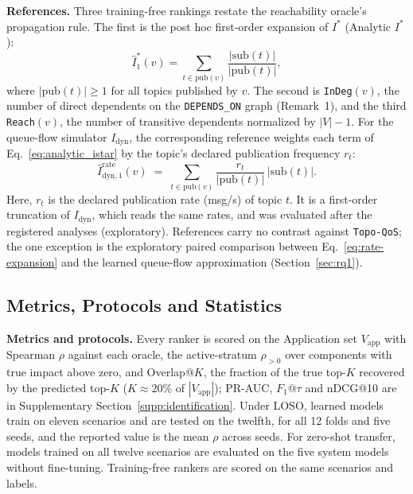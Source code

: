\noindent\textbf{References.} Three training-free rankings restate the reachability oracle's propagation rule. The first is the post hoc first-order expansion of $I^*$ (Analytic $I^*$):
\begin{equation}
\label{eq:analytic_istar}
\hat{I}^*_1(v) = \sum_{t \in \text{pub}(v)} \frac{|\text{sub}(t)|}{|\text{pub}(t)|},
\end{equation}
where $|\text{pub}(t)| \ge 1$ for all topics published by $v$. The second is \texttt{InDeg}$(v)$, the number of direct dependents on the \texttt{DEPENDS\_ON} graph (Remark~1), and the third \texttt{Reach}$(v)$, the number of transitive dependents normalized by $|V| - 1$. For the queue-flow simulator $I_{\text{dyn}}$, the corresponding reference weights each term of Eq.~\eqref{eq:analytic_istar} by the topic's declared publication frequency $r_t$:
\begin{equation}
\hat{I}^{\mathrm{rate}}_{\mathrm{dyn},1}(v) \;=\; \sum_{t \in \mathrm{pub}(v)} \frac{r_t}{|\mathrm{pub}(t)|}\,\lvert \mathrm{sub}(t) \rvert.
\label{eq:rate-expansion}
\end{equation}
Here, $r_t$ is the declared publication rate (msg/s) of topic $t$. It is a first-order truncation of $I_{\text{dyn}}$, which reads the same rates, and was evaluated after the registered analyses (exploratory). References carry no contrast against \texttt{Topo-QoS}; the one exception is the exploratory paired comparison between Eq.~\eqref{eq:rate-expansion} and the learned queue-flow approximation (Section~\ref{sec:rq1}).

\subsection{Metrics, Protocols and Statistics}
\label{sec:6.3}

\noindent\textbf{Metrics and protocols.} Every ranker is scored on the Application set $V_{\text{app}}$ with Spearman $\rho$ against each oracle, the active-stratum $\rho_{>0}$ over components with true impact above zero, and Overlap@$K$, the fraction of the true top-$K$ recovered by the predicted top-$K$ ($K \approx 20\%$ of $|V_{\text{app}}|$); PR-AUC, $F_1@\tau$ and nDCG@10 are in Supplementary Section~\ref{supp:identification}. Under LOSO, learned models train on eleven scenarios and are tested on the twelfth, for all 12 folds and five seeds, and the reported value is the mean $\rho$ across seeds. For zero-shot transfer, models trained on all twelve scenarios are evaluated on the five system models without fine-tuning. Training-free rankers are scored on the same scenarios and labels.

